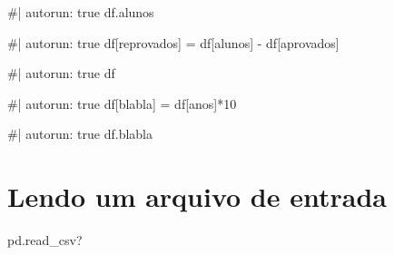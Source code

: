 \documentclass[
  letterpaper,
  DIV=11,
  numbers=noendperiod]{scrreprt}
\newenvironment{Shaded}{\begin{snugshade}}{\end{snugshade}}
\newcommand{\NormalTok}[1]{\textcolor[rgb]{0.00,0.23,0.31}{#1}}
\begin{document}
\begin{Shaded}
\begin{Highlighting}[]
\NormalTok{\#| autorun: true}
\NormalTok{df.alunos}
\end{Highlighting}
\end{Shaded}

\begin{Shaded}
\begin{Highlighting}[]
\NormalTok{\#| autorun: true}
\NormalTok{df[\textquotesingle{}reprovados\textquotesingle{}] = df[\textquotesingle{}alunos\textquotesingle{}] {-} df[\textquotesingle{}aprovados\textquotesingle{}]}
\end{Highlighting}
\end{Shaded}

\begin{Shaded}
\begin{Highlighting}[]
\NormalTok{\#| autorun: true}
\NormalTok{df}
\end{Highlighting}
\end{Shaded}

\begin{Shaded}
\begin{Highlighting}[]
\NormalTok{\#| autorun: true}
\NormalTok{df[\textquotesingle{}blabla\textquotesingle{}] = df[\textquotesingle{}anos\textquotesingle{}]*10}
\end{Highlighting}
\end{Shaded}

\begin{Shaded}
\begin{Highlighting}[]
\NormalTok{\#| autorun: true}
\NormalTok{df.blabla}
\end{Highlighting}
\end{Shaded}

\section{Lendo um arquivo de entrada}\label{lendo-um-arquivo-de-entrada}

\begin{Shaded}
\begin{Highlighting}[]
\NormalTok{pd.read\_csv?}
\end{Highlighting}
\end{Shaded}
\end{document}
